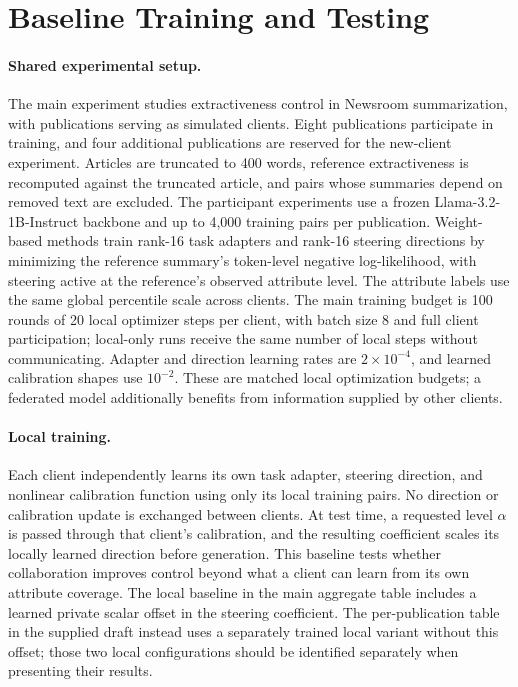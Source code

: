 \documentclass[11pt]{article}
\begin{document}
\section{Baseline Training and Testing}
\label{sec:costeer-baseline-protocol}

\paragraph{Shared experimental setup.}
The main experiment studies extractiveness control in Newsroom summarization, with publications serving as simulated clients. Eight publications participate in training, and four additional publications are reserved for the new-client experiment. Articles are truncated to 400 words, reference extractiveness is recomputed against the truncated article, and pairs whose summaries depend on removed text are excluded. The participant experiments use a frozen Llama-3.2-1B-Instruct backbone and up to 4,000 training pairs per publication. Weight-based methods train rank-16 task adapters and rank-16 steering directions by minimizing the reference summary's token-level negative log-likelihood, with steering active at the reference's observed attribute level. The attribute labels use the same global percentile scale across clients. The main training budget is 100 rounds of 20 local optimizer steps per client, with batch size 8 and full client participation; local-only runs receive the same number of local steps without communicating. Adapter and direction learning rates are $2\times10^{-4}$, and learned calibration shapes use $10^{-2}$. These are matched local optimization budgets; a federated model additionally benefits from information supplied by other clients.

\paragraph{Local training.}
Each client independently learns its own task adapter, steering direction, and nonlinear calibration function using only its local training pairs. No direction or calibration update is exchanged between clients. At test time, a requested level $\alpha$ is passed through that client's calibration, and the resulting coefficient scales its locally learned direction before generation. This baseline tests whether collaboration improves control beyond what a client can learn from its own attribute coverage. The local baseline in the main aggregate table includes a learned private scalar offset in the steering coefficient. The per-publication table in the supplied draft instead uses a separately trained local variant without this offset; those two local configurations should be identified separately when presenting their results.
\end{document}
